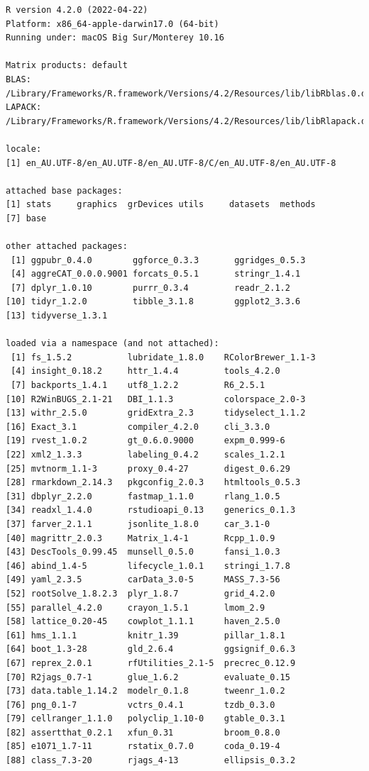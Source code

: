 \documentclass[article]{jss}
\begin{document}
\begin{verbatim}
R version 4.2.0 (2022-04-22)
Platform: x86_64-apple-darwin17.0 (64-bit)
Running under: macOS Big Sur/Monterey 10.16

Matrix products: default
BLAS:   /Library/Frameworks/R.framework/Versions/4.2/Resources/lib/libRblas.0.dylib
LAPACK: /Library/Frameworks/R.framework/Versions/4.2/Resources/lib/libRlapack.dylib

locale:
[1] en_AU.UTF-8/en_AU.UTF-8/en_AU.UTF-8/C/en_AU.UTF-8/en_AU.UTF-8

attached base packages:
[1] stats     graphics  grDevices utils     datasets  methods  
[7] base     

other attached packages:
 [1] ggpubr_0.4.0        ggforce_0.3.3       ggridges_0.5.3     
 [4] aggreCAT_0.0.0.9001 forcats_0.5.1       stringr_1.4.1      
 [7] dplyr_1.0.10        purrr_0.3.4         readr_2.1.2        
[10] tidyr_1.2.0         tibble_3.1.8        ggplot2_3.3.6      
[13] tidyverse_1.3.1    

loaded via a namespace (and not attached):
 [1] fs_1.5.2           lubridate_1.8.0    RColorBrewer_1.1-3
 [4] insight_0.18.2     httr_1.4.4         tools_4.2.0       
 [7] backports_1.4.1    utf8_1.2.2         R6_2.5.1          
[10] R2WinBUGS_2.1-21   DBI_1.1.3          colorspace_2.0-3  
[13] withr_2.5.0        gridExtra_2.3      tidyselect_1.1.2  
[16] Exact_3.1          compiler_4.2.0     cli_3.3.0         
[19] rvest_1.0.2        gt_0.6.0.9000      expm_0.999-6      
[22] xml2_1.3.3         labeling_0.4.2     scales_1.2.1      
[25] mvtnorm_1.1-3      proxy_0.4-27       digest_0.6.29     
[28] rmarkdown_2.14.3   pkgconfig_2.0.3    htmltools_0.5.3   
[31] dbplyr_2.2.0       fastmap_1.1.0      rlang_1.0.5       
[34] readxl_1.4.0       rstudioapi_0.13    generics_0.1.3    
[37] farver_2.1.1       jsonlite_1.8.0     car_3.1-0         
[40] magrittr_2.0.3     Matrix_1.4-1       Rcpp_1.0.9        
[43] DescTools_0.99.45  munsell_0.5.0      fansi_1.0.3       
[46] abind_1.4-5        lifecycle_1.0.1    stringi_1.7.8     
[49] yaml_2.3.5         carData_3.0-5      MASS_7.3-56       
[52] rootSolve_1.8.2.3  plyr_1.8.7         grid_4.2.0        
[55] parallel_4.2.0     crayon_1.5.1       lmom_2.9          
[58] lattice_0.20-45    cowplot_1.1.1      haven_2.5.0       
[61] hms_1.1.1          knitr_1.39         pillar_1.8.1      
[64] boot_1.3-28        gld_2.6.4          ggsignif_0.6.3    
[67] reprex_2.0.1       rfUtilities_2.1-5  precrec_0.12.9    
[70] R2jags_0.7-1       glue_1.6.2         evaluate_0.15     
[73] data.table_1.14.2  modelr_0.1.8       tweenr_1.0.2      
[76] png_0.1-7          vctrs_0.4.1        tzdb_0.3.0        
[79] cellranger_1.1.0   polyclip_1.10-0    gtable_0.3.1      
[82] assertthat_0.2.1   xfun_0.31          broom_0.8.0       
[85] e1071_1.7-11       rstatix_0.7.0      coda_0.19-4       
[88] class_7.3-20       rjags_4-13         ellipsis_0.3.2    
\end{verbatim}


\renewcommand\refname{Acknowledgments}
  
\end{document}
